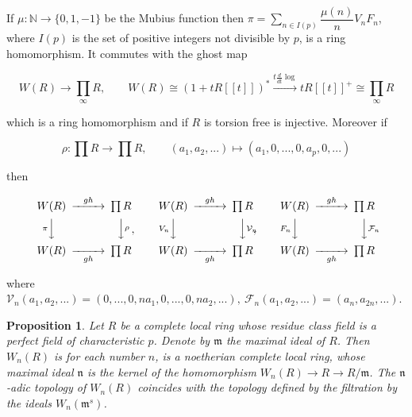 \documentclass[12pt,twoside]{amsart}
\newtheorem{proposition}[theorem]{Proposition}
\begin{document}
\noindent
If $\mu :\mathbb{N} \to \{0,1,-1\}$ be the Mubius function then $\pi=\sum_{n \in I(p)}\dfrac{\mu(n)}{n} V_nF_n$, where $I(p)$ is the set of positive integers not divisible by $p$, is a ring homomorphism. It commutes with the ghost map 

\[ W(R) \to \prod_{\infty} R, \qquad W(R) \cong (1+tR[[t]])^* \stackrel{t\frac{d}{dt}\log}{\longrightarrow} tR[[t]]^+ \cong \prod_{\infty} R \]

\vspace{0.5cm}

\noindent
which is a ring homomorphism and if $R$ is torsion free is injective. Moreover if 

\[ \rho:\prod R \to \prod R, \qquad (a_1,a_2,...) \mapsto (a_1,0,...,0,a_p,0,...) \]

\vspace{0.5cm}

\noindent
then

\begin{equation}
\begin{CD}
W(R)  @>gh>>  \prod R\\
@V{\pi}VV        @VV{\rho}V\\
W(R)  @>>gh> \prod R
\end{CD} , \qquad  
\begin{CD}
W(R)  @>gh>>  \prod R\\
@V{V_n}VV        @VV{\mathcal{V}_n}V\\
W(R)  @>>gh> \prod R
\end{CD} , \qquad  
\begin{CD}
W(R)  @>gh>>  \prod R\\
@V{F_n}VV        @VV{\mathcal{F}_n}V\\
W(R)  @>>gh> \prod R
\end{CD}
\end{equation}

\vspace{0.5cm}

\noindent
where $\mathcal{V}_n(a_1,a_2,...)=(0,...,0,na_1,0,...,0,na_2,...), \ \mathcal{F}_n(a_1,a_2,...)=(a_n,a_{2n},...)$.

\vspace{0.5cm}

\begin{proposition}\cite{LZ}
Let $R$ be a complete local ring whose residue class field is a perfect field of characteristic $p$. Denote by $\mathfrak{m}$ the maximal ideal of $R$. Then $W_n(R)$ is for each number $n$, is a noetherian complete local ring, whose maximal ideal $\mathfrak{n}$ is the kernel of the homomorphism $W_n(R) \to R \to R/\mathfrak{m}$. The $\mathfrak{n}$-adic topology of $W_n(R)$ coincides with the topology defined by the filtration by the ideals $W_n(\mathfrak{m}^s)$.

\end{proposition}
\end{document}
